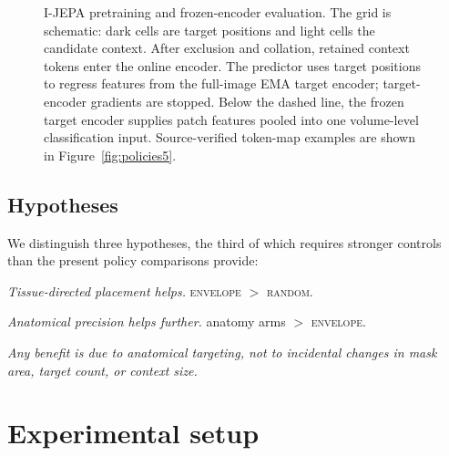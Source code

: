 \documentclass{article}
\begin{document}
\begin{figure}[t]
\caption{I-JEPA pretraining and frozen-encoder evaluation. The grid is schematic:
dark cells are target positions and light cells the candidate context. After
exclusion and collation, retained context tokens enter the online encoder.
The predictor uses target positions to regress features from the full-image
EMA target encoder; target-encoder gradients are stopped. Below the dashed
line, the frozen target encoder supplies patch features pooled into one
volume-level classification input. Source-verified token-map examples are
shown in Figure~\ref{fig:policies5}.}
\label{fig:policies}
\end{figure}

\subsection{Hypotheses}

We distinguish three hypotheses, the third of which requires stronger controls
than the present policy comparisons provide:

\begin{description}
\setlength{\itemsep}{1pt}\setlength{\parskip}{0pt}
\item[H1] \emph{Tissue-directed placement helps.} \textsc{envelope} $>$ \textsc{random}.
\item[H2] \emph{Anatomical precision helps further.} anatomy arms $>$
  \textsc{envelope}.
\item[H3] \emph{Any benefit is due to anatomical targeting, not to incidental
  changes in mask area, target count, or context size.}
\end{description}

\section{Experimental setup}
\label{sec:setup}
\end{document}
